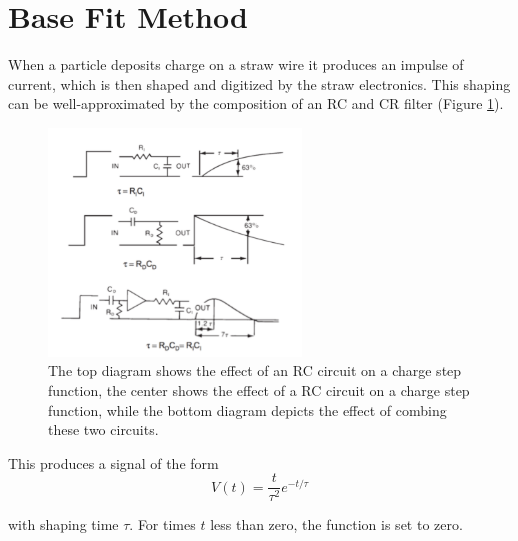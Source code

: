 \section{Base Fit Method}
 When a particle deposits charge on a straw wire it produces an impulse of current, which is then shaped and digitized by the straw electronics. This shaping can be well-approximated by the composition of an RC and CR filter (Figure \ref{RCCRCircuit}).
\begin{figure}[htp!]
    \centering
    \includegraphics[width=0.6\textwidth]{Images/RCCRCircuit.png}
    \caption{The top diagram shows the effect of an RC circuit on a charge step function, the center shows the effect of a RC circuit on a charge step function, while the bottom diagram depicts the effect of combing these two circuits.}
    \label{RCCRCircuit}
\end{figure} 
This produces a signal of the form 
\begin{equation}
  V(t) = \frac{t}{\tau^2} e^{-t / \tau}
\end{equation}

with shaping time $\tau$.
 For times $t$ less than zero, the function is set to zero.

